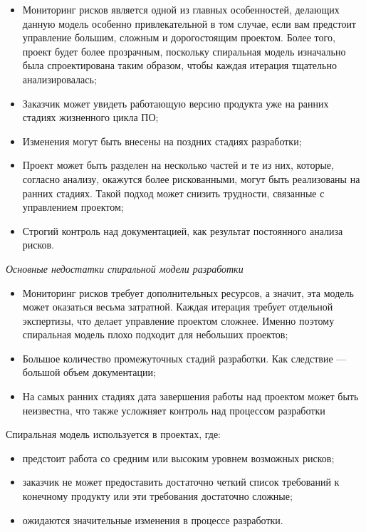 \documentclass[a4paper,14pt]{extarticle}
\begin{document}
 	\begin{itemize}
 		\item Мониторинг рисков является одной из главных особенностей, делающих данную модель особенно привлекательной в том случае, если вам предстоит управление большим, сложным и дорогостоящим проектом. Более того, проект будет более прозрачным, поскольку спиральная модель изначально была спроектирована таким образом, чтобы каждая итерация тщательно анализировалась;
 		\item Заказчик может увидеть работающую версию продукта уже на ранних стадиях жизненного цикла ПО;
 		\item Изменения могут быть внесены на поздних стадиях разработки;
 		\item Проект может быть разделен на несколько частей и те из них, которые, согласно анализу, окажутся более рискованными, могут быть реализованы на ранних стадиях. Такой подход может снизить трудности, связанные с управлением проектом;
 		\item Строгий контроль над документацией, как результат постоянного анализа рисков.
 	\end{itemize}
 	
 	\textit{Основные недостатки спиральной модели разработки}
 	
 	\begin{itemize}
 		\item Мониторинг рисков требует дополнительных ресурсов, а значит, эта модель может оказаться весьма затратной. Каждая итерация требует отдельной экспертизы, что делает управление проектом сложнее. Именно поэтому спиральная модель плохо подходит для небольших проектов;
 		\item Большое количество промежуточных стадий разработки. Как следствие — большой объем документации;
 		\item На самых ранних стадиях дата завершения работы над проектом может быть неизвестна, что также усложняет контроль над процессом разработки
 	\end{itemize}
 
 	Спиральная модель используется в проектах, где:
 	\begin{itemize}
 		\item предстоит работа со средним или высоким уровнем возможных рисков;
 		\item заказчик не может предоставить достаточно четкий список требований к конечному продукту или эти требования достаточно сложные;
 		\item ожидаются значительные изменения в процессе разработки.
 	\end{itemize}
 	
\end{document}
